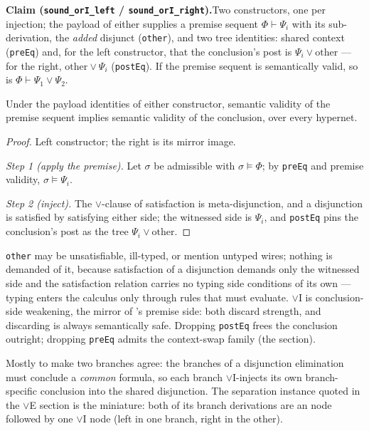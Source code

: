 

\textbf{Claim (\texttt{sound\_orI\_left} /
\texttt{sound\_orI\_right}).}\enspace Two constructors, one per
injection; the payload of either supplies a premise sequent
$\Phi \vdash \Psi_i$ with its sub-derivation, the \emph{added} disjunct
(\texttt{other}), and two tree identities: shared context
(\texttt{preEq}) and, for the left constructor, that the conclusion's
post is $\Psi_i \vee \mathrm{other}$ --- for the right,
$\mathrm{other} \vee \Psi_i$ (\texttt{postEq}). If the premise sequent
is semantically valid, so is $\Phi \vdash \Psi_1 \vee \Psi_2$.

\begin{bthm}\label{thm:ori-sound}
Under the payload identities of either constructor, semantic validity of
the premise sequent implies semantic validity of the conclusion, over
every hypernet.
\end{bthm}
\begin{proof}
Left constructor; the right is its mirror image.

\emph{Step 1 (apply the premise).} Let $\sigma$ be admissible with
$\sigma \models \Phi$; by \texttt{preEq} and premise validity,
$\sigma \models \Psi_i$.

\emph{Step 2 (inject).} The $\vee$-clause of satisfaction is
meta-disjunction, and a disjunction is satisfied by satisfying either
side; the witnessed side is $\Psi_i$, and \texttt{postEq} pins the
conclusion's post as the tree $\Psi_i \vee \mathrm{other}$.
\end{proof}

\begin{bremark}
\label{rem:ori-other}
\texttt{other} may be unsatisfiable, ill-typed, or mention untyped
wires; nothing is demanded of it, because satisfaction of a disjunction
demands only the witnessed side and the satisfaction relation carries no
typing side conditions of its own --- typing enters the calculus only
through rules that must evaluate. $\vee$I is conclusion-side weakening,
the mirror of 's premise side: both discard strength,
and discarding is always semantically safe. Dropping \texttt{postEq}
frees the conclusion outright; dropping \texttt{preEq} admits the
context-swap family (the  section).
\end{bremark}

\begin{bremark}
Mostly to make two branches agree: the branches of a disjunction
elimination must conclude a \emph{common} formula, so each branch
$\vee$I-injects its own branch-specific conclusion into the shared
disjunction. The separation instance quoted in the $\vee$E section is
the miniature: both of its branch derivations are an  node
followed by one $\vee$I node (left in one branch, right in the other).
\end{bremark}

